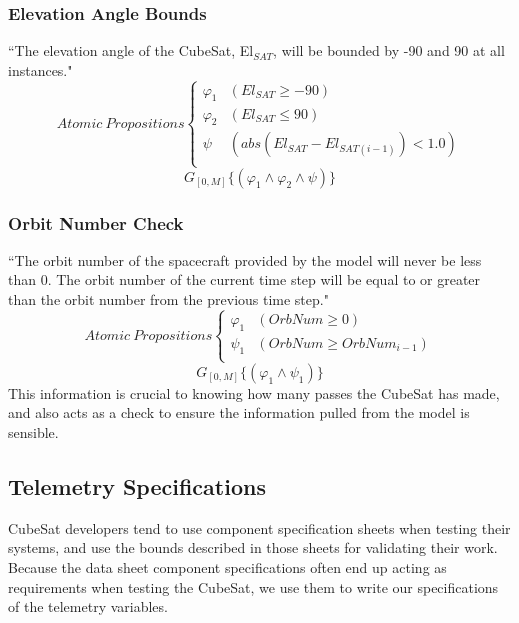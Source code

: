 \documentclass[conf]{new-aiaa}
\begin{document}
\subsubsection{\textbf{Elevation Angle Bounds}}
\label{ele}
“The elevation angle of the CubeSat, El$_{SAT}$, will be bounded by -90 and 90 at all instances."
\[ Atomic\:Propositions \begin{cases}
  \varphi_1 & (El_{SAT} \geq -90) \\
  \varphi_2 & (El_{SAT} \leq 90) \\
  \psi & (abs(El_{SAT} - El_{SAT(i-1)}) < 1.0) \\
\end{cases} \]
\begin{equation}
    \label{Spec 3}
    G_{[0,M]} \{(\varphi_1 \wedge \varphi_2 \wedge \psi)\}
\end{equation} 

\subsubsection{\textbf{Orbit Number Check}}
\label{onc}
“The orbit number of the spacecraft provided by the model will never be less than 0. The orbit number of the current time step will be equal to or greater than the orbit number from the previous time step."
\[ Atomic\:Propositions \begin{cases}
  \varphi_1 & (OrbNum \geq 0) \\
  \psi_1 & (OrbNum \geq OrbNum_{i-1})\\
\end{cases} \]
\begin{equation}
    \label{Spec 4}
    G_{[0,M]} \{(\varphi_1 \wedge \psi_1)\}
\end{equation} 
This information is crucial to knowing how many passes the CubeSat has made, and also acts as a check to ensure the information pulled from the model is sensible.

\subsection{Telemetry Specifications}
\label{telemspec}

CubeSat developers tend to use component specification sheets when testing their systems, and use the bounds described in those sheets for validating their work. Because the data sheet component specifications often end up acting as requirements when testing the CubeSat, we use them to write our specifications of the telemetry variables.
\end{document}
